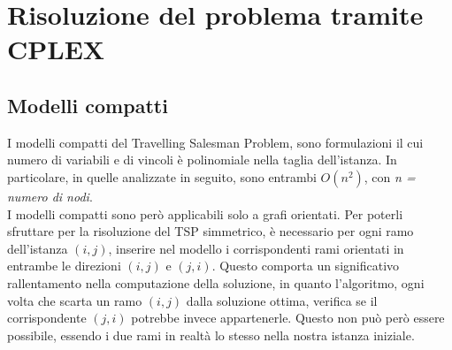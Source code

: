 \chapter{Risoluzione del problema tramite CPLEX}\label{CPLEX}  

\section{Modelli compatti}
I modelli compatti del Travelling Salesman Problem, sono formulazioni il cui numero di variabili e di vincoli è polinomiale nella taglia dell'istanza. In particolare, in quelle analizzate in seguito, sono entrambi $O(n^2)$, con \textit{n = numero di nodi}.\\
I modelli compatti sono però applicabili solo a grafi orientati. Per poterli sfruttare per la risoluzione del TSP simmetrico, è necessario per ogni ramo dell'istanza $(i,j)$, inserire nel modello i corrispondenti rami orientati in entrambe le direzioni $(i,j)$ e $(j,i)$. Questo comporta un significativo rallentamento nella computazione della soluzione, in quanto l'algoritmo, ogni volta che scarta un ramo $(i,j)$ dalla soluzione ottima, verifica se il corrispondente $(j,i)$ potrebbe invece appartenerle. Questo non può però essere possibile, essendo i due rami in realtà lo stesso nella nostra istanza iniziale.

